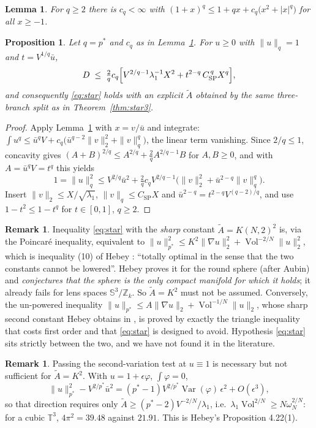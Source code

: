 \documentclass[11pt,reqno]{amsart}
\theoremstyle{plain}
\newtheorem{proposition}[theorem]{Proposition}
\newtheorem{lemma}[theorem]{Lemma}
\theoremstyle{definition}
\newtheorem{remark}[theorem]{Remark}
\newcommand{\Tor}{\mathbb{T}}
\newcommand{\Sph}{\mathbb{S}}
\newcommand{\pstar}{p^{*}}
\newcommand{\Vol}{\operatorname{Vol}}
\newcommand{\Ksob}{K}
\newcommand{\Csp}{C_{\mathrm{SP}}}
\newcommand{\Atil}{\widetilde{A}}
\begin{document}
\begin{lemma}
\label{lem:elem}
For $q\ge2$ there is $c_q<\infty$ with
$(1+x)^q\le1+qx+c_q\bigl(x^2+|x|^q\bigr)$ for all $x\ge-1$.
\end{lemma}

\begin{proposition}
\label{prop:starN}
Let $q=\pstar$ and $c_q$ as in Lemma~\ref{lem:elem}. For $u\ge0$ with
$\|u\|_{q}=1$ and $t=V^{1/q}\bar u$,
\[
  D\;\le\;\tfrac{2}{q}c_q\Bigl[V^{2/q-1}\lambda_1^{-1}X^2
        +t^{2-q}\,\Csp^{\,q}X^{q}\Bigr],
\]
and consequently \eqref{eq:star} holds with an explicit $\Atil$ obtained by the
same three-branch split as in Theorem~\ref{thm:star3}.
\end{proposition}

\begin{proof}
Apply Lemma~\ref{lem:elem} with $x=v/\bar u$ and integrate:
$\int u^q\le\bar u^qV+c_q\bigl(\bar u^{q-2}\|v\|_2^2+\|v\|_q^q\bigr)$, the linear
term vanishing. Since $2/q\le1$, concavity gives
$(A+B)^{2/q}\le A^{2/q}+\tfrac2qA^{2/q-1}B$ for $A,B\ge0$, and with
$A=\bar u^qV=t^q$ this yields
\[
  1=\|u\|_q^2\le V^{2/q}\bar u^2
     +\tfrac2qc_qV^{2/q-1}\bigl(\|v\|_2^2+\bar u^{2-q}\|v\|_q^q\bigr).
\]
Insert $\|v\|_2\le X/\sqrt{\lambda_1}$, $\|v\|_q\le\Csp X$ and
$\bar u^{2-q}=t^{2-q}V^{(q-2)/q}$, and use $1-t^2\le1-t^q$ for $t\in[0,1]$,
$q\ge2$.
\end{proof}

\begin{remark}
\label{rem:hebey}
Inequality \eqref{eq:star} with the \emph{sharp} constant $\Atil=\Ksob(N,2)^2$ is,
via the Poincaré inequality, equivalent to
$\|u\|^2_{\pstar}\le\Ksob^2\|\nabla u\|^2_2+\Vol^{-2/N}\|u\|_2^2$, which is
inequality (10) of Hebey \cite[\S4.5]{Hebey1996}: ``totally optimal in the sense
that the two constants cannot be lowered''. Hebey proves it for the round sphere
(after Aubin) and \emph{conjectures that the sphere is the only compact manifold
for which it holds}; it already fails for lens spaces $\Sph^3/\mathbb{Z}_k$. So
$\Atil=\Ksob^2$ must not be assumed. Conversely, the un-powered inequality
$\|u\|_{\pstar}\le A\|\nabla u\|_2+\Vol^{-1/N}\|u\|_2$, whose sharp second
constant Hebey obtains in \cite[\S4.1]{Hebey1996}, is proved by exactly the
triangle inequality that costs first order and that \eqref{eq:star} is designed to
avoid. Hypothesis \eqref{eq:star} sits strictly between the two, and we have not
found it in the literature.
\end{remark}

\begin{remark}
Passing the second-variation test at $u\equiv1$ is necessary but not sufficient
for $\Atil=\Ksob^2$. With $u=1+\epsilon\varphi$, $\int\varphi=0$,
\[
  \|u\|^2_{\pstar}-V^{2/\pstar}\bar u^2
   =(\pstar-1)V^{2/\pstar}\operatorname{Var}(\varphi)\,\epsilon^2+O(\epsilon^3),
\]
so that direction requires only $\Atil\ge(\pstar-2)V^{-2/N}/\lambda_1$, i.e.\
$\lambda_1\Vol^{2/N}\ge N\omega_N^{2/N}$: for a cubic $\Tor^3$,
$4\pi^2=39.48$ against $21.91$. This is Hebey's Proposition 4.22(1).
\end{remark}
\end{document}
